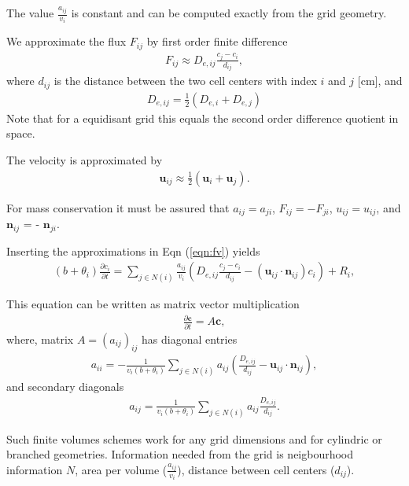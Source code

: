 \documentclass[a4paper,10pt]{article}
\begin{document}
The value $\frac{a_{ij}}{v_i}$ is constant and can be computed exactly from the grid geometry. 

We approximate the flux $F_{ij}$ by first order finite difference
\begin{eqnarray}
F_{ij}  \approx D_{e,ij} \frac{c_j - c_i} {d_{ij}},   
\end{eqnarray}
where $d_{ij}$ is the distance between the two cell centers with index $i$ and $j$ [cm], and
\begin{eqnarray}
D_{e,ij} = \frac12 (D_{e,i} + D_{e,j})
\end{eqnarray}
Note that for a equidisant grid this equals the second order difference quotient in space. 

The velocity is approximated by
\begin{eqnarray}
\mathbf{u}_{ij} \approx \frac12 (\mathbf{u}_i + \mathbf{u}_j).  
\end{eqnarray}

For mass conservation it must be assured that $a_{ij} = a_{ji}$,  $F_{ij} = -F_{ji}$,  $u_{ij}= u_{ij}$, and $\mathbf{n}_{ij}$ = - $\mathbf{n}_{ji}$.

Inserting the approximations in Eqn (\ref{eqn:fv}) yields
\begin{eqnarray}
 (b+\theta_i) \frac{\partial c_i}{\partial t}  =\sum_{j \in N(i)}  \frac{a_{ij}}{v_i} \left( D_{e,ij} \frac{c_j - c_i} {d_{ij}} - (\mathbf{u}_{ij}\cdot \mathbf{n}_{ij}) c_i \right) + R_i,  \label{eqn:fv2}
\end{eqnarray}

This equation can be written as matrix vector multiplication
\begin{eqnarray}
\frac{\partial \mathbf{c}}{\partial t}  = A \mathbf{c},  \label{eqn:matrix} \label{eq:ode}
\end{eqnarray}
where, matrix $A=(a_{ij})_{ij}$ has diagonal entries
\begin{eqnarray}
a_{ii} = - \frac{1}{v_i (b+\theta_i)} \sum_{j \in N(i)}  a_{ij} (\frac{D_{e,ij}}{d_{ij}} - \mathbf{u}_{ij}\cdot \mathbf{n}_{ij} ),
\end{eqnarray}
and secondary diagonals
\begin{eqnarray}
a_{ij} = \frac{1}{v_i (b+\theta_i)} \sum_{j \in N(i)} a_{ij} \frac{D_{e,ij}}{d_{ij}}.
\end{eqnarray}

Such finite volumes schemes work for any grid dimensions and for cylindric or branched geometries. Information needed from the grid is neigbourhood information $N$, area per volume ($\frac{a_{ij}}{v_i}$), distance between cell centers ($d_{ij}$).
\end{document}
